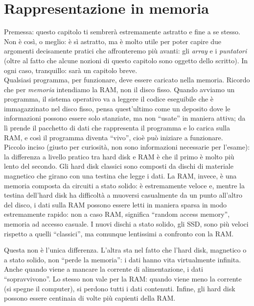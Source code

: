	\chapter{Rappresentazione in memoria}\label{mem}
	Premessa: questo capitolo ti sembrerà estremamente astratto e fine a se stesso. Non è così, o meglio: è sì astratto, ma è molto utile per poter capire due argomenti decisamente pratici che affronteremo più avanti: gli \emph{array} e i \emph{puntatori} (oltre al fatto che alcune nozioni di questo capitolo sono oggetto dello scritto). In ogni caso, tranquillo: sarà un capitolo breve.\\
	
	
	Qualsiasi programma, per funzionare, deve essere caricato nella memoria. Ricordo che per \emph{memoria} intendiamo la RAM, non il disco fisso. Quando avviamo un programma, il sistema operativo va a leggere il codice eseguibile che è immagazzinato nel disco fisso, pensa quest'ultimo come un deposito dove le informazioni possono essere solo stanziate, ma non ``usate'' in maniera attiva; da lì prende il pacchetto di dati che rappresenta il programma e lo carica sulla RAM, e così il programma diventa ``vivo'', cioè può iniziare a funzionare. \\
	
	
	Piccolo inciso (giusto per curiosità, non sono informazioni necessarie per l'esame): la differenza a livello pratico tra hard disk e RAM è che il primo è molto più lento del secondo. Gli hard disk classici sono composti da dischi di materiale magnetico che girano con una testina che legge i dati. La RAM, invece, è una memoria composta da circuiti a stato solido: è estremamente veloce e, mentre la testina dell'hard disk ha difficoltà a muoversi casualmente da un punto all'altro del disco, i dati sulla RAM possono essere letti in maniera sparsa in modo estremamente rapido: non a caso RAM, significa ``random access memory'', memoria ad accesso casuale. I nuovi dischi a stato solido, gli SSD, sono più veloci rispetto a quelli ``classici'', ma comunque lentissimi a confronto con la RAM.
	
	Questa non è l'unica differenza. L'altra sta nel fatto che l'hard disk, magnetico o a stato solido, non ``perde la memoria'': i dati hanno vita virtualmente infinita. Anche quando viene a mancare la corrente di alimentazione, i dati ``sopravvivono''. Lo stesso non vale per la RAM: quando viene meno la corrente (si spegne il computer), si perdono tutti i dati contenuti.  Infine, gli hard disk possono essere centinaia di volte più capienti della RAM. 
	
